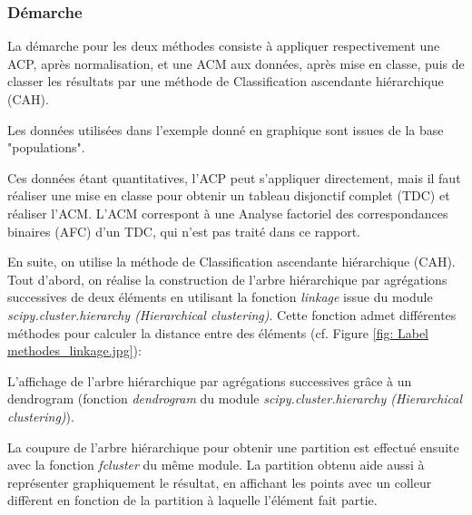 
\subsubsection{Démarche}

La démarche pour les deux méthodes consiste à appliquer respectivement une ACP, après normalisation, et une ACM aux données, après mise en classe, puis de classer les résultats par une méthode de Classification ascendante hiérarchique (CAH).

Les données utilisées dans l'exemple donné en graphique sont issues de la base "populations".

Ces données étant quantitatives, l'ACP peut s'appliquer directement, mais il faut réaliser une mise en classe pour obtenir un tableau disjonctif complet (TDC) et réaliser l'ACM. L'ACM correspont à une Analyse factoriel des correspondances binaires (AFC) d'un TDC, qui n'est pas traité dans ce rapport.

En suite, on utilise la méthode de Classification ascendante hiérarchique (CAH). Tout d'abord, on réalise la construction de l'arbre hiérarchique par agrégations successives de deux éléments en utilisant la fonction \textit{linkage} issue du module \textit{scipy.cluster.hierarchy (Hierarchical clustering)}. Cette fonction admet différentes méthodes pour calculer la distance entre des éléments (cf. Figure \ref{fig: Label methodes_linkage.jpg}):


L'affichage de l'arbre hiérarchique par agrégations successives grâce à un dendrogram (fonction \textit{dendrogram} du module \textit{scipy.cluster.hierarchy (Hierarchical clustering)}). 

La coupure de l'arbre hiérarchique pour obtenir une partition est effectué ensuite avec la fonction \textit{fcluster} du même module. La partition obtenu aide aussi à représenter graphiquement le résultat, en affichant les points avec un colleur diffèrent en fonction de la partition à laquelle l'élément fait partie.

